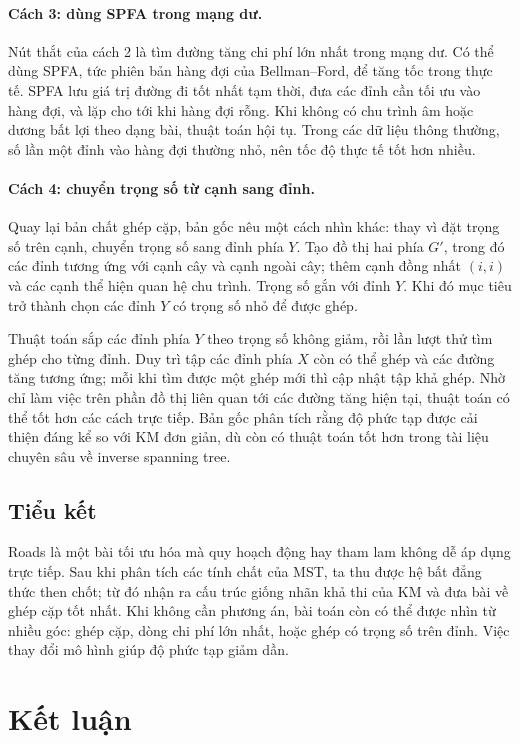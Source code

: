 \documentclass[11pt]{article}
\begin{document}
\paragraph{Cách 3: dùng SPFA trong mạng dư.}
Nút thắt của cách 2 là tìm đường tăng chi phí lớn nhất trong mạng dư. Có thể
dùng SPFA, tức phiên bản hàng đợi của Bellman--Ford, để tăng tốc trong thực
tế. SPFA lưu giá trị đường đi tốt nhất tạm thời, đưa các đỉnh cần tối ưu vào
hàng đợi, và lặp cho tới khi hàng đợi rỗng. Khi không có chu trình âm hoặc
dương bất lợi theo dạng bài, thuật toán hội tụ. Trong các dữ liệu thông thường,
số lần một đỉnh vào hàng đợi thường nhỏ, nên tốc độ thực tế tốt hơn nhiều.

\paragraph{Cách 4: chuyển trọng số từ cạnh sang đỉnh.}
Quay lại bản chất ghép cặp, bản gốc nêu một cách nhìn khác: thay vì đặt trọng
số trên cạnh, chuyển trọng số sang đỉnh phía $Y$. Tạo đồ thị hai phía $G'$,
trong đó các đỉnh tương ứng với cạnh cây và cạnh ngoài cây; thêm cạnh đồng
nhất $(i,i)$ và các cạnh thể hiện quan hệ chu trình. Trọng số gắn với đỉnh
$Y$. Khi đó mục tiêu trở thành chọn các đỉnh $Y$ có trọng số nhỏ để được ghép.

Thuật toán sắp các đỉnh phía $Y$ theo trọng số không giảm, rồi lần lượt thử
tìm ghép cho từng đỉnh. Duy trì tập các đỉnh phía $X$ còn có thể ghép và các
đường tăng tương ứng; mỗi khi tìm được một ghép mới thì cập nhật tập khả ghép.
Nhờ chỉ làm việc trên phần đồ thị liên quan tới các đường tăng hiện tại, thuật
toán có thể tốt hơn các cách trực tiếp. Bản gốc phân tích rằng độ phức tạp
được cải thiện đáng kể so với KM đơn giản, dù còn có thuật toán tốt hơn trong
tài liệu chuyên sâu về inverse spanning tree.

\subsection{Tiểu kết}

Roads là một bài tối ưu hóa mà quy hoạch động hay tham lam không dễ áp dụng
trực tiếp. Sau khi phân tích các tính chất của MST, ta thu được hệ bất đẳng
thức then chốt; từ đó nhận ra cấu trúc giống nhãn khả thi của KM và đưa bài
về ghép cặp tốt nhất. Khi không cần phương án, bài toán còn có thể được nhìn
từ nhiều góc: ghép cặp, dòng chi phí lớn nhất, hoặc ghép có trọng số trên
đỉnh. Việc thay đổi mô hình giúp độ phức tạp giảm dần.

\section{Kết luận}
\end{document}
